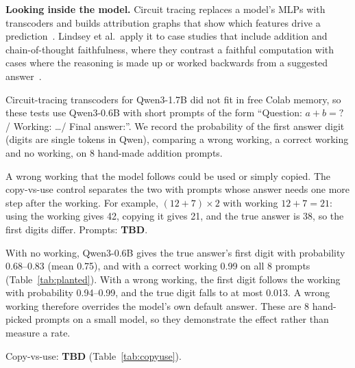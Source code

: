 
\textbf{Looking inside the model.} Circuit tracing replaces a model's MLPs with
transcoders and builds attribution graphs that show which features drive a
prediction~\cite{ameisen2025}. Lindsey et al.\ apply it to case studies that include
addition and chain-of-thought faithfulness, where they contrast a faithful
computation with cases where the reasoning is made up or worked backwards from a
suggested answer~\cite{lindsey2025}.

Circuit-tracing transcoders for Qwen3-1.7B did not fit in free Colab memory, so these
tests use Qwen3-0.6B with short prompts of the form ``Question: $a+b=?$ / Working:
\dots / Final answer:''. We record the probability of the first answer digit (digits
are single tokens in Qwen), comparing a wrong working, a correct working and no
working, on 8 hand-made addition prompts.

A wrong working that the model follows could be used or simply copied. The copy-vs-use
control separates the two with prompts whose answer needs one more step after the
working. For example, $(12+7)\times 2$ with working $12+7=21$: using the working gives
42, copying it gives 21, and the true answer is 38, so the first digits differ.
Prompts: \textbf{TBD}.

With no working, Qwen3-0.6B gives the true answer's first digit with probability
0.68--0.83 (mean 0.75), and with a correct working 0.99 on all 8 prompts
(Table~\ref{tab:planted}). With a wrong working, the first digit follows the working
with probability 0.94--0.99, and the true digit falls to at most 0.013. A wrong working
therefore overrides the model's own default answer. These are 8 hand-picked prompts
on a small model, so they demonstrate the effect rather than measure a rate.

Copy-vs-use: \textbf{TBD} (Table~\ref{tab:copyuse}).
